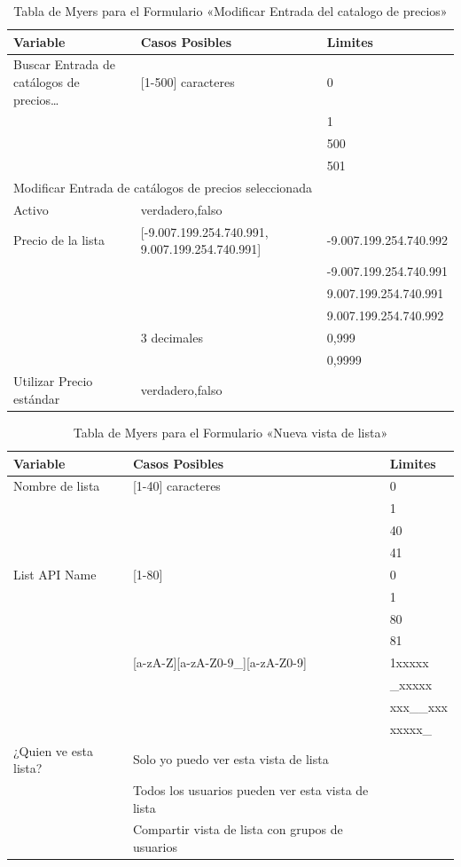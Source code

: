 \begin{table}
\centering
\begin{tabular}{|p{5.0cm}|p{5.0cm}|l|}
\hline
\textbf{Variable} & \textbf{Casos Posibles} & \textbf{Limites} \\
\hline
Buscar Entrada de catálogos de precios\ldots & [1-500] caracteres & 0 \\
& & 1 \\
& & 500 \\
& & 501 \\
\hline
\multicolumn{3}{|l|}{Modificar Entrada de catálogos de precios seleccionada} \\
\hline
Activo  & {verdadero,falso} & \\
\hline
Precio de la lista & [-9.007.199.254.740.991, 9.007.199.254.740.991] & -9.007.199.254.740.992 \\
& & -9.007.199.254.740.991 \\
& & 9.007.199.254.740.991 \\
& & 9.007.199.254.740.992 \\
& 3 decimales & 0,999 \\
& & 0,9999 \\
\hline
Utilizar Precio estándar & {verdadero,falso} & \\
\hline
\end{tabular}
\caption{Tabla de Myers para el Formulario «Modificar Entrada del catalogo de precios»}
\label{myers_06}
\end{table}

\begin{table}
\centering
\begin{tabular}{|l|l|l|}
\hline
\textbf{Variable} & \textbf{Casos Posibles} & \textbf{Limites} \\
\hline
Nombre de lista & [1-40] caracteres & 0 \\
& & 1 \\
& & 40 \\
& & 41 \\
\hline
List API Name & [1-80] & 0 \\
& & 1 \\
& & 80 \\
& & 81 \\
& [a-zA-Z][a-zA-Z0-9\_][a-zA-Z0-9] & 1xxxxx \\
& & \_xxxxx \\
& & xxx\_\_xxx \\
& & xxxxx\_ \\
\hline
¿Quien ve esta lista? & Solo yo puedo ver esta vista de lista & \\
& Todos los usuarios pueden ver esta vista de lista & \\
& Compartir vista de lista con grupos de usuarios & \\
\hline
\end{tabular}
\caption{Tabla de Myers para el Formulario «Nueva vista de lista»}
\label{myers_07}
\end{table}

